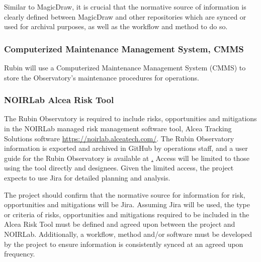 Similar to MagicDraw, it is crucial that the normative source of information is clearly defined between MagicDraw and other repositories which are synced or used for archival purposes, as well as the workflow and method to do so.

\subsubsection{Computerized Maintenance Management System, CMMS}

Rubin will use a Computerized Maintenance Management System  (CMMS) to store the Observatory's maintenance procedures for operations. 


\subsubsection{NOIRLab Alcea Risk Tool}

The Rubin Observatory is required to include risks, opportunities and mitigations in the NOIRLab managed risk management software tool, Alcea Tracking Solutions software \url{https://noirlab.alceatech.com/}.
The Rubin Observatory information is exported and archived in GitHub by operations staff, and a user guide for the Rubin Observatory is available at \href{https://rtn-051.lsst.io/}.
Access will be limited to those using the tool directly and designees.
Given the limited access, the project expects to use Jira for detailed planning and analysis.

The project should confirm that the normative source for information for risk, opportunities and mitigations will be Jira.
Assuming Jira will be used, the type or criteria of risks, opportunities and mitigations required to be included in the Alcea Risk Tool must be defined and agreed upon between the project and NOIRLab.
Additionally, a workflow, method and/or software must be developed by the project to ensure information is consistently synced at an agreed upon frequency.
